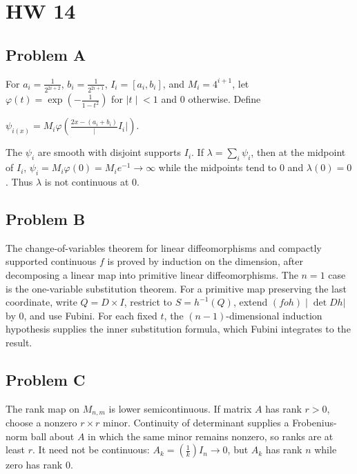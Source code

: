 \chapter{HW 14}

\section{Problem A}

For \(a_{i} = \frac{1}{2^{2i + 2}}\), \(b_{i} = \frac{1}{2^{2i + 1}}\), \(I_{i} = \left\lbrack {a_{i},b_{i}} \right\rbrack\), and \(M_{i} = 4^{i + 1}\), let \(\varphi(t) = \exp\left( {- \frac{1}{1 - t^{2}}} \right)\) for \(\left. |t \middle| < 1 \right.\) and \(0\) otherwise. Define

\(\psi_{i{(x)}} = M_{i}\varphi\left( {\frac{2x - \left( {a_{i} + b_{i}} \right)}{|}I_{i}|} \right).\)

The \(\psi_{i}\) are smooth with disjoint supports \(I_{i}\). If \(\lambda = \sum_{i}\psi_{i}\), then at the midpoint of \(I_{i}\), \(\psi_{i} = M_{i}\varphi(0) = M_{i}e^{- 1}\rightarrow\infty\) while the midpoints tend to \(0\) and \(\lambda(0) = 0\). Thus \(\lambda\) is not continuous at \(0\).

\section{Problem B}

The change-of-variables theorem for linear diffeomorphisms and compactly supported continuous \(f\) is proved by induction on the dimension, after decomposing a linear map into primitive linear diffeomorphisms. The \(n = 1\) case is the one-variable substitution theorem. For a primitive map preserving the last coordinate, write \(Q = D \times I\), restrict to \(S = h^{- 1}(Q)\), extend \(\left. \left( {foh} \right) \middle| \det Dh| \right.\) by \(0\), and use Fubini. For each fixed \(t\), the \(\left( {n - 1} \right)\)-dimensional induction hypothesis supplies the inner substitution formula, which Fubini integrates to the result.

\section{Problem C}

The rank map on \(M_{n,m}\) is lower semicontinuous. If matrix \(A\) has rank \(r > 0\), choose a nonzero \(r \times r\) minor. Continuity of determinant supplies a Frobenius-norm ball about \(A\) in which the same minor remains nonzero, so ranks are at least \(r\). It need not be continuous: \(A_{k} = \left( \frac{1}{k} \right)I_{n}\rightarrow 0\), but \(A_{k}\) has rank \(n\) while zero has rank \(0\).
